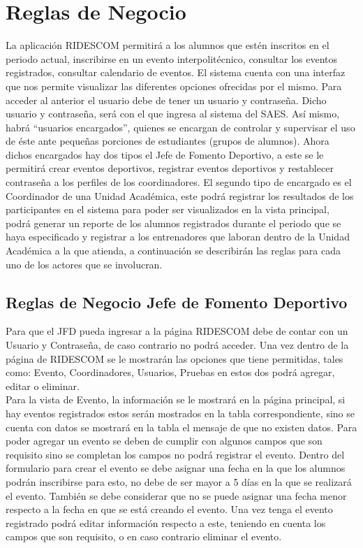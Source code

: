 	\section{Reglas de Negocio}
	\noindent La aplicación RIDESCOM permitirá a los alumnos que estén inscritos en el periodo actual, inscribirse en un evento interpolitécnico, consultar los eventos registrados, consultar calendario de eventos. 
	El sistema cuenta con una interfaz que nos permite visualizar las diferentes opciones ofrecidas por el mismo. Para acceder al anterior el usuario debe de tener un usuario y contraseña. Dicho usuario y contraseña, será con el que ingresa al sistema del SAES. 
	Así mismo, habrá “usuarios encargados”, quienes se encargan de controlar y supervisar el uso de éste ante pequeñas porciones de estudiantes (grupos de alumnos). Ahora dichos encargados hay dos tipos el Jefe de Fomento Deportivo, a este se le permitirá crear eventos deportivos, registrar eventos deportivos y restablecer contraseña a los perfiles de los coordinadores. El segundo tipo de encargado es el Coordinador de una Unidad Académica, este podrá registrar los resultados de los participantes en el sistema para poder ser visualizados en la vista principal, podrá generar un reporte de los alumnos registrados durante el periodo que se haya especificado y registrar a los entrenadores que laboran dentro de la Unidad Académica a la que atienda, a continuación se describirán las reglas para cada uno de los actores que se involucran.
	
	\subsection{Reglas de Negocio Jefe de Fomento Deportivo}
	Para que el JFD pueda ingresar a la página RIDESCOM debe de contar con un Usuario y Contraseña, de caso contrario no podrá acceder.
	Una vez dentro de la página de RIDESCOM se le mostrarán las opciones que tiene permitidas, tales como: Evento, Coordinadores, Usuarios, Pruebas en estos dos podrá agregar, editar o eliminar. \\
	
	\noindent Para la vista de Evento, la información se le mostrará en la página principal, si hay eventos registrados estos serán mostrados en la tabla correspondiente, sino se cuenta con datos se mostrará en la tabla el mensaje de que no existen datos.  Para poder agregar un evento se deben de cumplir con algunos campos que son requisito sino se completan los campos no podrá registrar el evento.  Dentro del formulario para crear el evento se debe asignar una fecha en la que los alumnos podrán inscribirse para esto, no debe de ser mayor  a 5 días en la que se realizará el evento. También se debe considerar que no se puede asignar una fecha menor respecto a la fecha en que se está creando el evento. Una vez tenga el evento registrado podrá editar información respecto a este, teniendo en cuenta los campos que son requisito, o en caso contrario eliminar el evento.\\
	
